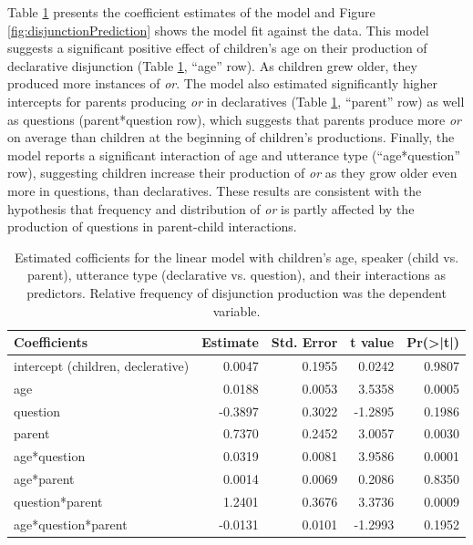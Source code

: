 \documentclass[
  english,
  ,man,floatsintext]{apa6}
\begin{document}
Table \ref{tab:study1coeftable} presents the coefficient estimates of the model and Figure \ref{fig:disjunctionPrediction} shows the model fit against the data. This model suggests a significant positive effect of children's age on their production of declarative disjunction (Table \ref{tab:study1coeftable}, ``age'' row). As children grew older, they produced more instances of \emph{or}. The model also estimated significantly higher intercepts for parents producing \emph{or} in declaratives (Table \ref{tab:study1coeftable}, ``parent'' row) as well as questions (parent*question row), which suggests that parents produce more \emph{or} on average than children at the beginning of children's productions. Finally, the model reports a significant interaction of age and utterance type (``age*question'' row), suggesting children increase their production of \emph{or} as they grow older even more in questions, than declaratives. These results are consistent with the hypothesis that frequency and distribution of \emph{or} is partly affected by the production of questions in parent-child interactions.

\begin{table}

\caption{\label{tab:study1coeftable}Estimated cofficients for the linear model with children's age, speaker (child vs. parent), utterance type (declarative vs. question), and their interactions as predictors. Relative frequency of disjunction production was the dependent variable.}
\centering
\fontsize{9}{11}\selectfont
\begin{tabular}[t]{l|r|r|r|r}
\hline
Coefficients & Estimate & Std. Error & t value & Pr(>|t|)\\
\hline
intercept (children, declerative) & 0.0047 & 0.1955 & 0.0242 & 0.9807\\
\hline
age & 0.0188 & 0.0053 & 3.5358 & 0.0005\\
\hline
question & -0.3897 & 0.3022 & -1.2895 & 0.1986\\
\hline
parent & 0.7370 & 0.2452 & 3.0057 & 0.0030\\
\hline
age*question & 0.0319 & 0.0081 & 3.9586 & 0.0001\\
\hline
age*parent & 0.0014 & 0.0069 & 0.2086 & 0.8350\\
\hline
question*parent & 1.2401 & 0.3676 & 3.3736 & 0.0009\\
\hline
age*question*parent & -0.0131 & 0.0101 & -1.2993 & 0.1952\\
\hline
\end{tabular}
\end{table}
\end{document}

